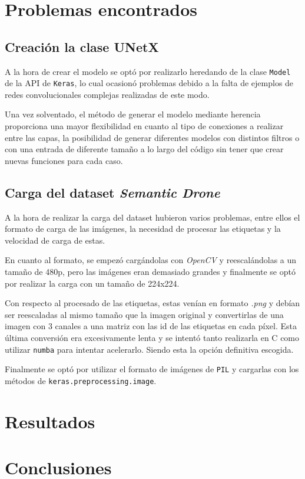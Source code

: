 \documentclass[a4paper]{article}
\begin{document}
\section{Problemas encontrados}
\subsection{Creación la clase UNetX}
A la hora de crear el modelo se optó por realizarlo heredando de la clase \texttt{Model} de la API de \texttt{Keras}, lo cual ocasionó problemas debido a la falta de ejemplos de redes convolucionales complejas realizadas de este modo.
\newline

Una vez solventado, el m\'etodo de generar el modelo mediante herencia proporciona una mayor flexibilidad en cuanto al tipo de conexiones a realizar entre las capas, la posibilidad de generar diferentes modelos con distintos filtros o con una entrada de diferente tama\~no a lo largo del c\'odigo sin tener que crear nuevas funciones para cada caso.


\subsection{Carga del dataset \textit{Semantic Drone}}
A la hora de realizar la carga del dataset hubieron varios problemas, entre ellos el formato de carga de las imágenes, la necesidad de procesar las etiquetas y la velocidad de carga de estas.\newline

En cuanto al formato, se empezó cargándolas con \textit{OpenCV} y reescal\'andolas a un tamaño de 480p, pero las imágenes eran demasiado grandes y finalmente se optó por realizar la carga con un tamaño de 224x224.\newline

Con respecto al procesado de las etiquetas, estas venían en formato \textit{.png} y debían ser reescaladas al mismo tamaño que la imagen original y convertirlas de una imagen con 3 canales a una matriz con las id de las etiquetas en cada píxel. Esta última conversión era excesivamente lenta y se intentó tanto realizarla en C como utilizar \texttt{numba} para intentar acelerarlo. Siendo esta la opción definitiva escogida.\newline

Finalmente se optó por utilizar el formato de imágenes de \texttt{PIL} y cargarlas con los métodos de \texttt{keras.preprocessing.image}.

\section{Resultados}

\section{Conclusiones}

\newpage
\printbibliography
\end{document}
